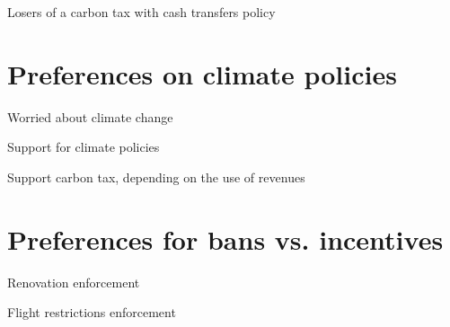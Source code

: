 \documentclass{article}
\begin{document}
\begin{table}[h!]
	\caption{Losers of a carbon tax with cash transfers policy}
	\begin{center}
		\scalebox{0.7}{}
	\end{center}
\end{table}	

\section{Preferences on climate policies}

\begin{table}[h!]
	\caption{Worried about climate change}
	\begin{center}
		\scalebox{0.7}{}
	\end{center}
\end{table}	

\begin{table}[h!]
	\caption{Support for climate policies}
	\begin{center}
		\scalebox{0.7}{}
	\end{center}
\end{table}	

\begin{table}[h!]
	\caption{Support carbon tax, depending on the use of revenues}
	\begin{center}
		\scalebox{0.7}{}
	\end{center}
\end{table}	

\section{Preferences for bans vs. incentives}

\begin{table}[h!]
	\caption{Renovation enforcement}
	\begin{center}
		\scalebox{0.7}{}
	\end{center}
\end{table}	

\begin{table}[h!]
	\caption{Flight restrictions enforcement}
	\begin{center}
		\scalebox{0.7}{}
	\end{center}
\end{table}	
\end{document}

